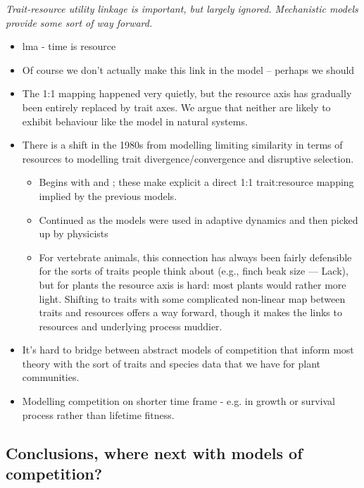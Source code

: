 \documentclass[a4paper,11pt]{article}
\begin{document}
\textit{Trait-resource utility linkage is important, but largely
  ignored.  Mechanistic models provide some sort of way forward.}

\begin{itemize}
\item lma - time is resource
\item Of course we don't actually make this link in the model --
  perhaps we should
\item The 1:1 mapping happened very quietly, but the resource axis has
  gradually been entirely replaced by trait axes.  We argue that
  neither are likely to exhibit behaviour like the
  \citet{MacArthur-1967} model in natural systems.
\item There is a shift in the 1980s from modelling limiting
  similarity in terms of resources to modelling trait
  divergence/convergence and disruptive selection.
  \begin{itemize}
  \item Begins with \citet{Taper-1985} and \citet{Brown-1987-140}; these
    make explicit a direct 1:1 trait:resource mapping implied by the
    previous models.
  \item Continued as the models were used in adaptive dynamics
    \citep[e.g.,][]{Dieckmann-1999} and then picked up by physicists
    \citep[e.g.,][]{Leimar-2013}
  \item For vertebrate animals, this connection has always been fairly
    defensible for the sorts of traits people think about (e.g., finch
    beak size --- Lack), but for plants the resource axis is hard: most
    plants would rather more light.  Shifting to traits with some
    complicated non-linear map between traits and resources offers a way
    forward, though it makes the links to resources and underlying
    process muddier.
  \end{itemize}
\item It's hard to bridge between abstract models of competition that
  inform most theory with the sort of traits and species data that we
  have for plant communities.
\item Modelling competition on shorter time frame - e.g. in growth or
survival process rather than lifetime fitness. 
\end{itemize}

\subsection{Conclusions, where next with models of competition?}
\end{document}
